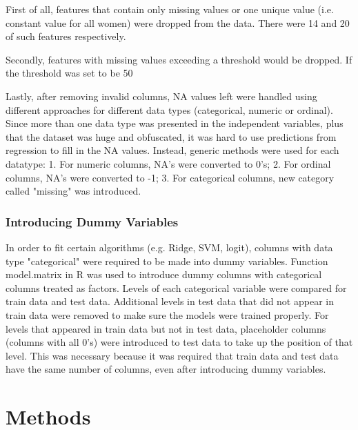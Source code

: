 \documentclass{article}\usepackage[]{graphicx}\usepackage[]{color}
\begin{document}
First of all, features that contain only missing values or one unique value (i.e. constant value for all women) were dropped from the data. There were 14 and 20 of such features respectively.

Secondly, features with missing values exceeding a threshold would be dropped. If the threshold was set to be 50%

Lastly, after removing invalid columns, NA values left were handled using different approaches for different data types (categorical, numeric or ordinal). Since more than one data type was presented in the independent variables, plus that the dataset was huge and obfuscated, it was hard to use predictions from regression to fill in the NA values. Instead, generic methods were used for each datatype:
1. For numeric columns, NA's were converted to 0's;
2. For ordinal columns, NA's were converted to -1;
3. For categorical columns, new category called "missing" was introduced.

\subsubsection{Introducing Dummy Variables}
In order to fit certain algorithms (e.g. Ridge, SVM, logit), columns with data type "categorical" were required to be made into dummy variables. Function model.matrix in R was used to introduce dummy columns with categorical columns treated as factors.
Levels of each categorical variable were compared for train data and test data. Additional levels in test data that did not appear in train data were removed to make sure the models were trained properly. For levels that appeared in train data but not in test data, placeholder columns (columns with all 0's) were introduced to test data to take up the position of that level. This was necessary because it was required that train data and test data have the same number of columns, even after introducing dummy variables.

\section{Methods}
\label{sec:methods}
\end{document}
